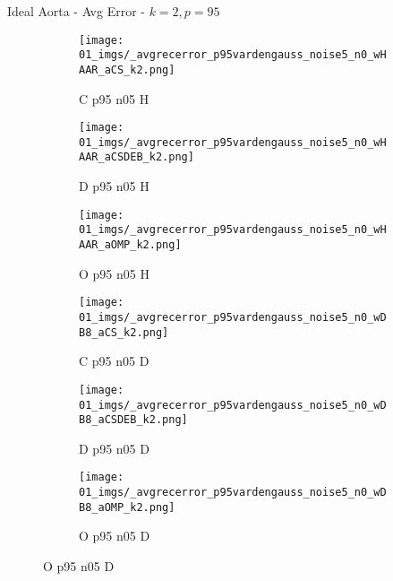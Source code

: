 \begin{frame}{Ideal Aorta - Avg Error - $k=2,p=95$}{}
\begin{figure}
\begin{subfigure}{0.13\textwidth}
\texttt{[image: 01\_imgs/\_avgrecerror\_p95vardengauss\_noise5\_n0\_wHAAR\_aCS\_k2.png]}
\caption*{\tiny C p95 n05 H}
\end{subfigure}
\begin{subfigure}{0.13\textwidth}
\texttt{[image: 01\_imgs/\_avgrecerror\_p95vardengauss\_noise5\_n0\_wHAAR\_aCSDEB\_k2.png]}
\caption*{\tiny D p95 n05 H}
\end{subfigure}
\begin{subfigure}{0.13\textwidth}
\texttt{[image: 01\_imgs/\_avgrecerror\_p95vardengauss\_noise5\_n0\_wHAAR\_aOMP\_k2.png]}
\caption*{\tiny O p95 n05 H}
\end{subfigure}
\begin{subfigure}{0.13\textwidth}
\texttt{[image: 01\_imgs/\_avgrecerror\_p95vardengauss\_noise5\_n0\_wDB8\_aCS\_k2.png]}
\caption*{\tiny C p95 n05 D}
\end{subfigure}
\begin{subfigure}{0.13\textwidth}
\texttt{[image: 01\_imgs/\_avgrecerror\_p95vardengauss\_noise5\_n0\_wDB8\_aCSDEB\_k2.png]}
\caption*{\tiny D p95 n05 D}
\end{subfigure}
\begin{subfigure}{0.13\textwidth}
\texttt{[image: 01\_imgs/\_avgrecerror\_p95vardengauss\_noise5\_n0\_wDB8\_aOMP\_k2.png]}
\caption*{\tiny O p95 n05 D}
\end{subfigure}

\vspace{5pt}


\end{figure}
\end{frame}
